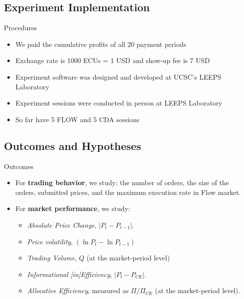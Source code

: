 \documentclass[10pt]{beamer}
\begin{document}
\subsection{Experiment Implementation}

\begin{frame}{Procedures}
    \begin{itemize}
        \item We paid the cumulative profits of all 20 payment periods
        \item Exchange rate is 1000 ECUs = 1 USD and show-up fee is 7 USD %
        \item Experiment software was designed and developed at UCSC's LEEPS Laboratory
        \item Experiment sessions were conducted in person at LEEPS Laboratory
        \item So far have 5  FLOW and 5 CDA sessions
    \end{itemize}
\end{frame}

\subsection{Outcomes and Hypotheses}


\begin{frame}{Outcomes}
    \begin{itemize}
        \item For \textbf{trading behavior}, we study: 
     the number of orders, the size of the orders, submitted prices, and
     the maximum execution rate in Flow market. %
        \item For \textbf{market performance}, we study:
        \begin{itemize}
        \item \textit{Absolute Price Change}, $|P_t - P_{t-1}|$. 
        \item \textit{Price volatility}, $(\ln P_t - \ln P_{t-1})$ 
         \item \textit{Trading Volume}, $Q$ (at the market-period level)
\item\textit{Informational [in]Efficiency},  \( |P_t - P_{\text{CE}}| \). 
    \item\textit{Allocative Efficiency}, measured as \( \Pi/\Pi_{\text{CE}}\) (at the market-period level). 
        \end{itemize}
     
    \end{itemize}
\end{frame}
\end{document}
